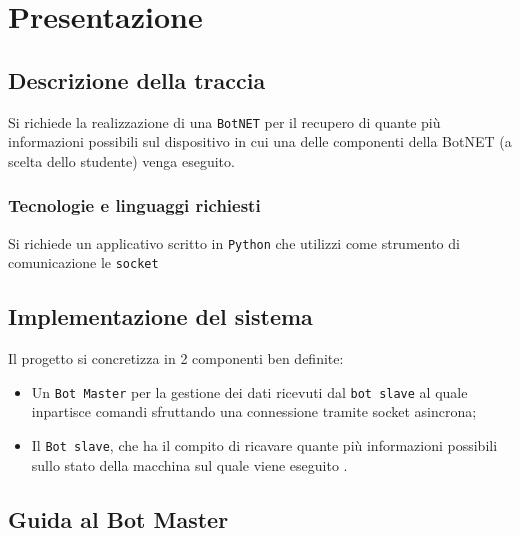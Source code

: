 \documentclass[letterpaper, 11pt]{article}
\begin{document}
\newpage
\restoregeometry
\pagebreak
\section{Presentazione}
\label{Presentazione progetto}
\noindent{}
\subsection{Descrizione della traccia}
\label{Descrizione traccia}
Si richiede la realizzazione di una \texttt{BotNET} \autocite{BOTNET} per il recupero di quante più informazioni possibili sul dispositivo in cui una delle componenti della BotNET (a scelta dello studente) venga eseguito.
\subsubsection{Tecnologie e linguaggi richiesti}
\label{Tecnologie e linguaggi}
Si richiede un applicativo scritto in \texttt{Python} \autocite{DefinizionePython} che utilizzi come strumento di comunicazione le \texttt{socket} \autocite{DefinizioneSocket}
\subsection{Implementazione del sistema}
\label{Implementazione sistema}
Il progetto si concretizza in 2 componenti ben definite:
\begin{itemize}
\item Un \texttt{Bot Master} per la gestione dei dati ricevuti dal \texttt{bot slave} al quale inpartisce comandi sfruttando una connessione tramite socket asincrona;
\item Il \texttt{Bot slave}, che ha il compito di ricavare quante più informazioni possibili sullo stato della macchina sul quale viene eseguito \autocite{notaBotSlave1} .
\end{itemize}
\vfill
\subsection{Guida al Bot Master}
\label{Guida (Bot master)}
\end{document}

